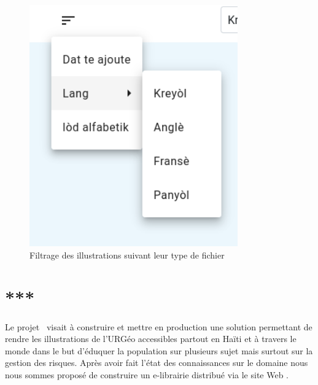 	
		\begin{figure}[htb]
			\centering
			\includegraphics[width=0.8\textwidth]{Pictures/Trie.png}
			\caption{Filtrage des illustrations suivant leur type de fichier}
			\label{FigFiltreIllustration}
		\end{figure}
	



\chapter*{***}
	
	Le projet \projectName\ visait \`a construire et mettre en production une solution permettant de rendre les illustrations de l'URG\'eo accessibles partout en Ha\"iti et \`a travers le monde dans le but d'\'eduquer la population sur plusieurs sujet mais surtout sur la gestion des risques. Apr\`es avoir fait l'\'etat des connaissances sur le domaine nous nous sommes propos\'e de construire un e-librairie distribu\'e via le site Web \projectName .
	\vspace{15pt}
	
